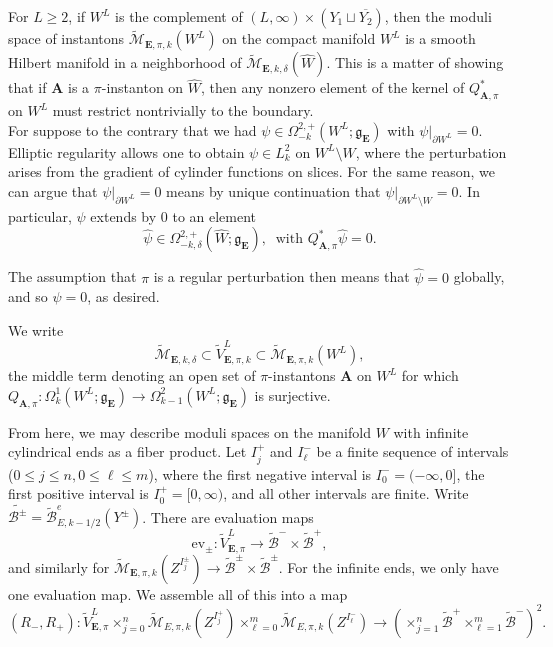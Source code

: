 \documentclass[10pt,a4paper]{amsart}
\theoremstyle{definition}
\theoremstyle{remark}
\numberwithin{figure}{qchap}
\begin{document}
For $L \geq 2$, if $W^L$ is the complement of $(L,\infty) \times (Y_1 \sqcup \overline{Y_2})$, then the moduli space of instantons $\widetilde{\mathcal M}_{\mathbf{E},\pi,k}(W^L)$ on the compact manifold $W^L$ is a smooth Hilbert manifold in a neighborhood of $\widetilde{\mathcal M}_{\mathbf{E},k,\delta}(\hat W)$. This is a matter of showing that if $\mathbf{A}$ is a $\pi$-instanton on $\hat W$, then any nonzero element of the kernel of $Q^*_{\mathbf{A},\pi}$ on $W^L$ must restrict nontrivially to the boundary.\\

For suppose to the contrary that we had $\psi \in \Omega^{2,+}_{-k}(W^L;\mathfrak g_{\mathbf{E}})$ with $\psi|_{\partial W^L} = 0$. Elliptic regularity allows one to obtain $\psi \in L^2_k$ on $W^L \setminus W$, where the perturbation arises from the gradient of cylinder functions on slices. For the same reason, we can argue that $\psi|_{\partial W^L} = 0$ means by unique continuation that $\psi|_{\partial W^L \setminus W} = 0$. In particular, $\psi$ extends by $0$ to an element 
$$\hat \psi \in \Omega^{2,+}_{-k,\delta}(\hat W;\mathfrak g_{\mathbf{E}}), \;\; \text{with } Q^*_{\mathbf{A},\pi}\hat \psi = 0.$$

The assumption that $\pi$ is a regular perturbation then means that $\hat \psi = 0$ globally, and so $\psi = 0$, as desired. 

We write 
$$\widetilde{\mathcal M}_{\mathbf{E},k,\delta} \subset \widetilde V^L_{\mathbf{E},\pi,k} \subset \widetilde{\mathcal M}_{\mathbf{E},\pi,k}(W^L),$$
the middle term denoting an open set of $\pi$-instantons $\mathbf{A}$ on $W^L$ for which $Q_{\mathbf{A},\pi}: \Omega^1_k(W^L;\mathfrak g_{\mathbf{E}}) \to \Omega^2_{k-1}(W^L;\mathfrak g_{\mathbf{E}})$ is surjective. 

From here, we may describe moduli spaces on the manifold $W$ with infinite cylindrical ends as a fiber product. Let $I^+_j$ and $I^-_\ell$ be a finite sequence of intervals ($0 \leq j \leq n, 0 \leq \ell \leq m$), where the first negative interval is $I^-_0 = (-\infty, 0]$, the first positive interval is $I^+_0 = [0,\infty)$, and all other intervals are finite. Write $\widetilde{\mathcal B^\pm} = \widetilde{\mathcal B}^e_{E,k-1/2}(Y^\pm)$. There are evaluation maps $$\text{ev}_\pm: \widetilde{V}^L_{\mathbf{E},\pi} \to \widetilde{\mathcal B}^- \times \widetilde{\mathcal B}^+,$$ and similarly for $\widetilde{\mathcal M}_{\mathbf{E},\pi,k}(Z^{I^\pm_j}) \to \widetilde{\mathcal B}^\pm \times \widetilde{\mathcal B}^\pm$. For the infinite ends, we only have one evaluation map. We assemble all of this into a map $$(R_-, R_+): \widetilde{V}^L_{\mathbf{E},\pi} \times_{j=0}^n \widetilde{\mathcal M}_{E,\pi,k}(Z^{I^+_j}) \times_{\ell=0}^m \widetilde{\mathcal M}_{E,\pi,k}(Z^{I^-_{\ell}}) \to \left(\times_{j=1}^n\widetilde{\mathcal B}^+ \times_{\ell=1}^m \widetilde{\mathcal B}^-\right)^2.$$
\end{document}
